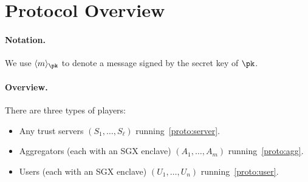\section{Protocol Overview}

\paragraph{Notation.} We use $\signed{m}{\pk}$ to denote a message signed by the secret key of $\pk$.

\paragraph{Overview.}

There are three types of players:

\begin{itemize}
    \item Any trust servers $(S_1, \dots, S_\ell)$ running~\cref{proto:server}.
    \item Aggregators (each with an SGX enclave) $(A_1, \dots, A_m)$ running~\cref{proto:agg}.
    \item Users (each with an SGX enclave) $(U_1, \dots, U_n)$ running~\cref{proto:user}.
\end{itemize}

\newcommand{\schedstate}{\mathsf{State}_\text{sched}}
\newcommand{\schedmsgin}{m_\text{in}}
\newcommand{\schedmsgout}{m_\text{out}}
\newcommand{\schedround}{r_\text{sched}}

